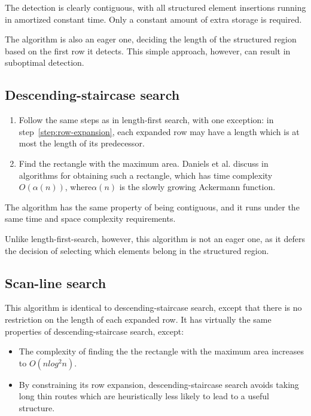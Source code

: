 The detection is clearly contiguous, with all structured element insertions running in amortized constant time. Only a constant amount of extra storage is required.

The algorithm is also an eager one, deciding the length of the structured region based on the first row it detects. This simple approach, however, can result in suboptimal detection.



\subsection{Descending-staircase search}
\begin{enumerate}
\item Follow the same steps as in length-first search, with one exception: in step~\ref{step:row-expansion}, each expanded row may have a length which is at most the length of its predecessor.
\item Find the rectangle with the maximum area. Daniels et al. discuss in~\cite{daniels1997finding} algorithms for obtaining such a rectangle, which has time complexity $O(\alpha(n))$, where$\alpha(n)$ is the slowly growing Ackermann function.
\end{enumerate}

The algorithm has the same property of being contiguous, and it runs under the same time and space complexity requirements.

Unlike length-first-search, however, this algorithm is not an eager one, as it defers the decision of selecting which elements belong in the structured region.



\subsection{Scan-line search}
This algorithm is identical to descending-staircase search, except that there is no restriction on the length of each expanded row. It has virtually the same properties of descending-staircase search, except:
\begin{itemize}
\item The complexity of finding the the rectangle with the maximum area increases to $O(n log^2 n)$.
\item By constraining its row expansion, descending-staircase search avoids taking long thin routes which are heuristically less likely to lead to a useful structure.
\end{itemize}





